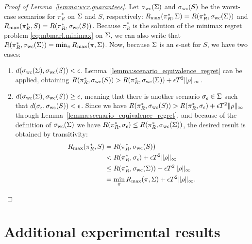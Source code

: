 \begin{proof}[Proof of Lemma~\ref{lemma:wcr.guarantees}]
         Let $\sigma_\text{wc}(\Sigma)$ and $\sigma_\text{wc}(S)$ be the worst-case scenarios for $\pi^*_R$ on $\Sigma$ and $S$, respectively: $R_\text{max}(\pi^*_R, \Sigma) = R(\pi^*_R, \sigma_\text{wc}(\Sigma))$ and $R_\text{max}(\pi^*_R, S) = R(\pi^*_R, \sigma_\text{wc}(S))$. Because $\pi^*_R$ is the solution of the minimax regret problem \eqref{eq:mbmarl.minimax} on $\Sigma$, we can also write that $R(\pi^*_R, \sigma_\text{wc}(\Sigma)) = \min_\pi R_\text{max}(\pi, \Sigma)$. Now, because $\Sigma$ is an $\epsilon$-net for $S$, we have two cases: 
    \begin{enumerate}
        \item $d(\sigma_\text{wc}(\Sigma), \sigma_\text{wc}(S)) < \epsilon$. Lemma~\ref{lemma:scenario_equivalence_regret} can be applied, obtaining $R(\pi^*_R, \sigma_\text{wc}(S)) > R(\pi^*_R, \sigma_\text{wc}(\Sigma)) + \epsilon T^2 \lVert \rho \rVert_\infty$.
        
        \item $d(\sigma_\text{wc}(\Sigma), \sigma_\text{wc}(S)) \geq \epsilon$, meaning that there is another scenario $\sigma_\epsilon \in \Sigma$ such that  $d(\sigma_\epsilon, \sigma_\text{wc}(S)) < \epsilon$.
        Since we have $R(\pi^*_R, \sigma_\text{wc}(S)) > R(\pi^*_R,\sigma_\epsilon) + \epsilon T^2 \lVert \rho \rVert_\infty$ through Lemma~\ref{lemma:scenario_equivalence_regret}, and because of the definition of $\sigma_\text{wc}(\Sigma)$ we have $R(\pi^*_R, \sigma_\epsilon)\leq R(\pi^*_R, \sigma_\text{wc}(\Sigma))$, the desired result is obtained by transitivity:
        \begin{align}
            R_\text{max}(\pi^*_R, S) &= R(\pi^*_R, \sigma_\text{wc}(S))\\
            &< R(\pi^*_R,\sigma_\epsilon) + \epsilon T^2\lVert \rho \rVert_\infty\\
            & \leq R(\pi^*_R, \sigma_\text{wc}(\Sigma)) + \epsilon T^2\lVert \rho \rVert_\infty\\
            & = \min_\pi R_\text{max}(\pi, \Sigma) + \epsilon T^2\lVert \rho \rVert_\infty.
        \end{align}
    \end{enumerate}
\end{proof}


\section{Additional experimental results}

